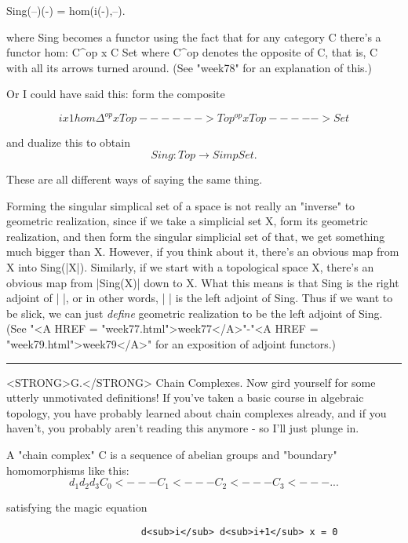                  Sing(--)(-) = hom(i(-),--).

where Sing becomes a functor using the fact that for any category C
there's a functor 
hom: C^{op} x C \to  Set
where C^{op} denotes the opposite of C, that is, C
with all its arrows turned around.  (See
"week78" for an explanation of this.)

Or I could have said this: form the composite

$$
                                i x 1               hom
                 \Delta ^{op} x Top ------> Top^{op} x Top -----> Set

$$
    
and dualize this to obtain
$$
                 Sing: Top \to  SimpSet.
$$
    
These are all different ways of saying the same thing.   

Forming the singular simplical set of a space is not really 
an "inverse"
to geometric realization, since if we take a simplicial set X, form its
geometric realization, and then form the singular simplicial set of
that, we get something much bigger than X.  However, if you think about
it, there's an obvious map from X into Sing(|X|).  Similarly, if we
start with a topological space X, there's an obvious map from |Sing(X)|
down to X.  
What this means is that Sing is the right adjoint of | |, or in other
words, | | is the left adjoint of Sing.  Thus if we want to be slick,
we can just \emph{define} geometric realization to be the left adjoint of
Sing. (See "<A HREF = "week77.html">week77</A>"-"<A HREF = "week79.html">week79</A>" for an exposition of adjoint functors.)

\par\noindent\rule{\textwidth}{0.4pt}
<STRONG>G.</STRONG>  Chain Complexes.  Now gird yourself for some utterly unmotivated
definitions!  If you've taken a basic course in algebraic topology, you
have probably learned about chain complexes already, and if you haven't,
you probably aren't reading this anymore - so I'll just plunge in.


 A "chain complex" C is a sequence of abelian groups and
"boundary" homomorphisms like this:
$$

                 d_{1}      d_{2}      d_{3}
            C_{0} <--- C_{1} <--- C_{2} <--- C_{3} <--- ...
$$
    
satisfying the magic equation
\begin{verbatim}
                        d<sub>i</sub> d<sub>i+1</sub> x = 0
\end{verbatim}
    
